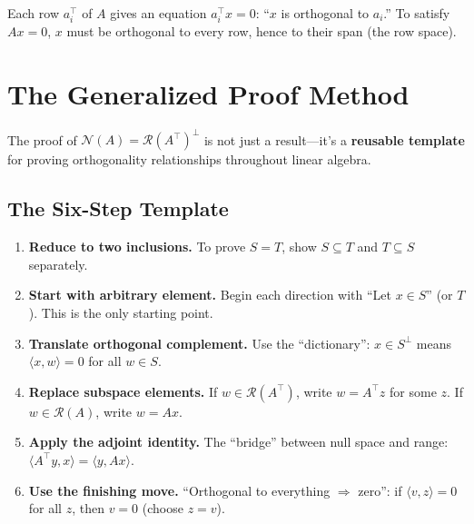 \documentclass[10pt, twocolumn]{article}
\theoremstyle{definition}
\theoremstyle{plain}
\newcommand{\NN}{\mathcal{N}}
\newcommand{\Range}{\mathcal{R}}
\begin{document}
\begin{tcolorbox}[colframe=black!50, title={\small Intuition}]
Each row $a_i^\top$ of $A$ gives an equation $a_i^\top x = 0$: ``$x$ is orthogonal to $a_i$.'' To satisfy $Ax = 0$, $x$ must be orthogonal to every row, hence to their span (the row space).
\end{tcolorbox}

\section{The Generalized Proof Method}

\begin{tcolorbox}[colframe=black!50, title={\small Key Insight}]
The proof of $\NN(A) = \Range(A^\top)^\perp$ is not just a result---it's a \textbf{reusable template} for proving orthogonality relationships throughout linear algebra.
\end{tcolorbox}

\subsection{The Six-Step Template}

\begin{enumerate}
    \item \textbf{Reduce to two inclusions.} To prove $S = T$, show $S \subseteq T$ and $T \subseteq S$ separately.

    \item \textbf{Start with arbitrary element.} Begin each direction with ``Let $x \in S$'' (or $T$). This is the only starting point.

    \item \textbf{Translate orthogonal complement.} Use the ``dictionary'': $x \in S^\perp$ means $\langle x, w \rangle = 0$ for all $w \in S$.

    \item \textbf{Replace subspace elements.} If $w \in \Range(A^\top)$, write $w = A^\top z$ for some $z$. If $w \in \Range(A)$, write $w = Ax$.

    \item \textbf{Apply the adjoint identity.} The ``bridge'' between null space and range: $\langle A^\top y, x \rangle = \langle y, Ax \rangle$.

    \item \textbf{Use the finishing move.} ``Orthogonal to everything $\Rightarrow$ zero'': if $\langle v, z \rangle = 0$ for all $z$, then $v = 0$ (choose $z = v$).
\end{enumerate}
\end{document}
